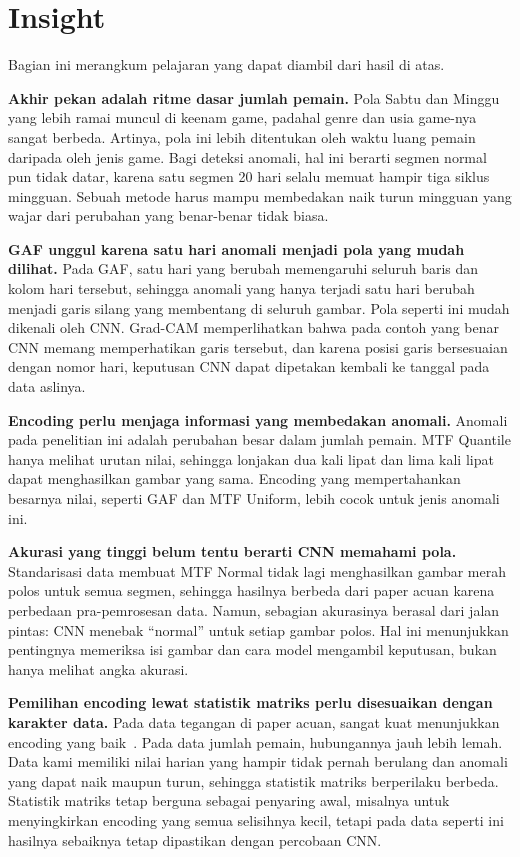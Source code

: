 \section{Insight}

Bagian ini merangkum pelajaran yang dapat diambil dari hasil di atas.

\textbf{Akhir pekan adalah ritme dasar jumlah pemain.} Pola Sabtu dan Minggu yang lebih ramai muncul di keenam game, padahal genre dan usia game-nya sangat berbeda. Artinya, pola ini lebih ditentukan oleh waktu luang pemain daripada oleh jenis game. Bagi deteksi anomali, hal ini berarti segmen normal pun tidak datar, karena satu segmen 20 hari selalu memuat hampir tiga siklus mingguan. Sebuah metode harus mampu membedakan naik turun mingguan yang wajar dari perubahan yang benar-benar tidak biasa.

\textbf{GAF unggul karena satu hari anomali menjadi pola yang mudah dilihat.} Pada GAF, satu hari yang berubah memengaruhi seluruh baris dan kolom hari tersebut, sehingga anomali yang hanya terjadi satu hari berubah menjadi garis silang yang membentang di seluruh gambar. Pola seperti ini mudah dikenali oleh CNN. Grad-CAM memperlihatkan bahwa pada contoh yang benar CNN memang memperhatikan garis tersebut, dan karena posisi garis bersesuaian dengan nomor hari, keputusan CNN dapat dipetakan kembali ke tanggal pada data aslinya.

\textbf{Encoding perlu menjaga informasi yang membedakan anomali.} Anomali pada penelitian ini adalah perubahan besar dalam jumlah pemain. MTF Quantile hanya melihat urutan nilai, sehingga lonjakan dua kali lipat dan lima kali lipat dapat menghasilkan gambar yang sama. Encoding yang mempertahankan besarnya nilai, seperti GAF dan MTF Uniform, lebih cocok untuk jenis anomali ini.

\textbf{Akurasi yang tinggi belum tentu berarti CNN memahami pola.} Standarisasi data membuat MTF Normal tidak lagi menghasilkan gambar merah polos untuk semua segmen, sehingga hasilnya berbeda dari paper acuan karena perbedaan pra-pemrosesan data. Namun, sebagian akurasinya berasal dari jalan pintas: CNN menebak ``normal'' untuk setiap gambar polos. Hal ini menunjukkan pentingnya memeriksa isi gambar dan cara model mengambil keputusan, bukan hanya melihat angka akurasi.

\textbf{Pemilihan encoding lewat statistik matriks perlu disesuaikan dengan karakter data.} Pada data tegangan di paper acuan, \dsd{} sangat kuat menunjukkan encoding yang baik~\cite{rahadian2023}. Pada data jumlah pemain, hubungannya jauh lebih lemah. Data kami memiliki nilai harian yang hampir tidak pernah berulang dan anomali yang dapat naik maupun turun, sehingga statistik matriks berperilaku berbeda. Statistik matriks tetap berguna sebagai penyaring awal, misalnya untuk menyingkirkan encoding yang semua selisihnya kecil, tetapi pada data seperti ini hasilnya sebaiknya tetap dipastikan dengan percobaan CNN.

